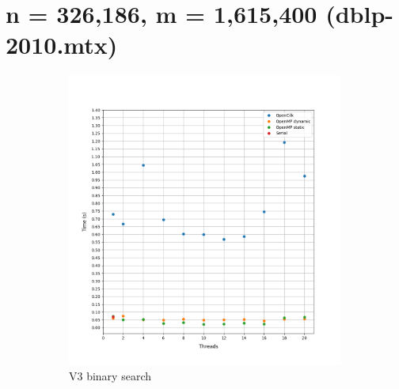 \documentclass[12pt, a4paper]{article}
\begin{document}
\section{n = 326,186, m = 1,615,400 (dblp-2010.mtx)}


\begin{figure}[h!]
     \begin{subfigure}[b]{0.33\textwidth}
         \centering
         \includegraphics[height=.4\textheight, width=\textwidth, keepaspectratio]{assets/dblp/v3.png}
    \caption{V3 binary search}
     \end{subfigure}
     \hfill
     \begin{subfigure}[b]{0.33\textwidth}
         \centering

\end{subfigure}
\end{figure}
\end{document}
